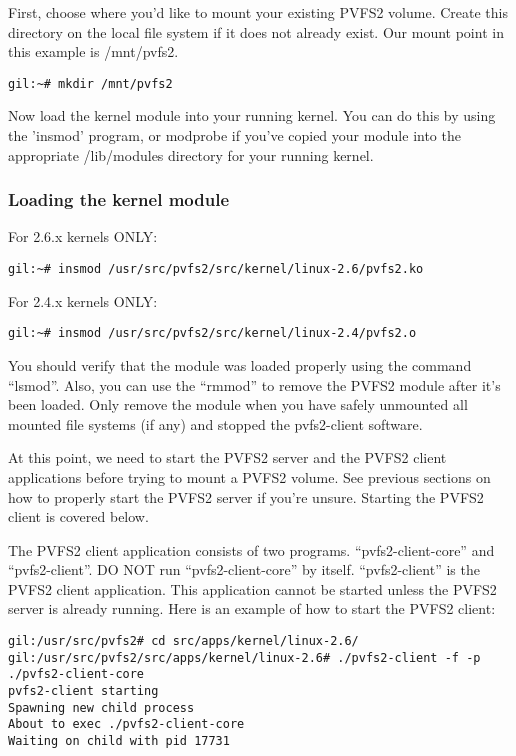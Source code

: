 \documentclass[11pt, letterpaper]{article}
\begin{document}
First, choose where you'd like to mount your existing PVFS2 volume.
Create this directory on the local file system if it does not already
exist.  Our mount point in this example is /mnt/pvfs2.

\begin{verbatim}
gil:~# mkdir /mnt/pvfs2
\end{verbatim}

Now load the kernel module into your running kernel.  You can do this
by using the 'insmod' program, or modprobe if you've copied your
module into the appropriate /lib/modules directory for your running
kernel.

\subsubsection{Loading the kernel module}
For 2.6.x kernels ONLY:
\begin{verbatim}
gil:~# insmod /usr/src/pvfs2/src/kernel/linux-2.6/pvfs2.ko
\end{verbatim}

For 2.4.x kernels ONLY:
\begin{verbatim}
gil:~# insmod /usr/src/pvfs2/src/kernel/linux-2.4/pvfs2.o
\end{verbatim}

You should verify that the module was loaded properly using the
command ``lsmod''.  Also, you can use the ``rmmod'' to remove the
PVFS2 module after it's been loaded.  Only remove the module when you
have safely unmounted all mounted file systems (if any) and stopped
the pvfs2-client software.

At this point, we need to start the PVFS2 server and the PVFS2 client
applications before trying to mount a PVFS2 volume.  See previous
sections on how to properly start the PVFS2 server if you're unsure.
Starting the PVFS2 client is covered below.

The PVFS2 client application consists of two programs.
``pvfs2-client-core'' and ``pvfs2-client''.  DO NOT run
``pvfs2-client-core'' by itself.  ``pvfs2-client'' is the PVFS2 client
application.  This application cannot be started unless the PVFS2
server is already running.  Here is an example of how to start the
PVFS2 client:

\begin{verbatim}
gil:/usr/src/pvfs2# cd src/apps/kernel/linux-2.6/
gil:/usr/src/pvfs2/src/apps/kernel/linux-2.6# ./pvfs2-client -f -p ./pvfs2-client-core
pvfs2-client starting
Spawning new child process
About to exec ./pvfs2-client-core
Waiting on child with pid 17731
\end{verbatim}
\end{document}

